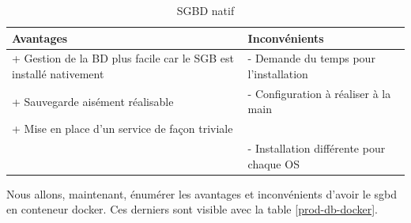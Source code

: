 \documentclass[
    iai, %
    il, %
]{heig-tb}
\begin{document}
\begin{table}[h]
    \begin{center}
        \caption{SGBD natif \label{prod-db-native}}
        \begin{tabularx}{1.0\textwidth} {X|X}
            Avantages                                                         & Inconvénients                            \\ \hline
            + Gestion de la BD plus facile car le SGB est installé nativement & - Demande du temps
            pour l'installation                                                                                          \\
            + Sauvegarde aisément réalisable                                  & - Configuration à réaliser à la main     \\
            + Mise en place d'un service de façon triviale                    &                                          \\
                                                                              & - Installation différente pour chaque OS \\
        \end{tabularx}
    \end{center}
\end{table}

Nous allons, maintenant, énumérer les avantages et inconvénients d'avoir le \Gls{sgbd} en \Gls{conteneur}
\Gls{docker}. Ces derniers sont visible avec la table \ref{prod-db-docker}.
\end{document}
